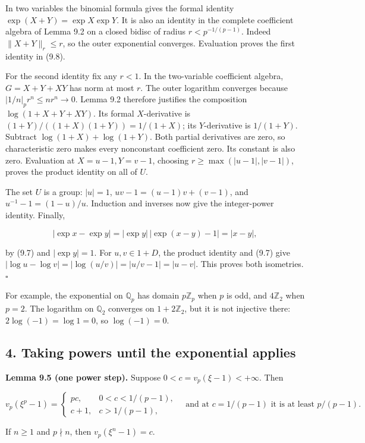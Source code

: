 \documentclass[
  11pt,
  a4paper,
]{article}
\begin{document}
In two variables the binomial formula gives the formal identity
\(\exp(X+Y)=\exp X\exp Y\). It is also an identity in the complete
coefficient algebra of Lemma 9.2 on a closed bidisc of radius
\(r<p^{-1/(p-1)}\). Indeed \(\|X+Y\|_r\le r\), so the outer exponential
converges. Evaluation proves the first identity in (9.8).

For the second identity fix any \(r<1\). In the two-variable coefficient
algebra, \(G=X+Y+XY\) has norm at most \(r\). The outer logarithm
converges because \(|1/n|_p r^n\le nr^n\to0\). Lemma 9.2 therefore
justifies the composition \(\log(1+X+Y+XY)\). Its formal
\(X\)-derivative is \((1+Y)/((1+X)(1+Y))=1/(1+X)\); its \(Y\)-derivative
is \(1/(1+Y)\). Subtract \(\log(1+X)+\log(1+Y)\). Both partial
derivatives are zero, so characteristic zero makes every nonconstant
coefficient zero. Its constant is also zero. Evaluation at
\(X=u-1,Y=v-1\), choosing \(r\ge\max(|u-1|,|v-1|)\), proves the product
identity on all of \(U\).

The set \(U\) is a group: \(|u|=1\), \(uv-1=(u-1)v+(v-1)\), and
\(u^{-1}-1=(1-u)/u\). Induction and inverses now give the integer-power
identity. Finally,

\[
|\exp x-\exp y|=|\exp y|\,|\exp(x-y)-1|=|x-y|,
\]

by (9.7) and \(|\exp y|=1\). For \(u,v\in1+D\), the product identity and
(9.7) give \(|\log u-\log v|=|\log(u/v)|=|u/v-1|=|u-v|\). This proves
both isometries. \(\square\)

For example, the exponential on \(\mathbb Q_p\) has domain
\(p\mathbb Z_p\) when \(p\) is odd, and \(4\mathbb Z_2\) when \(p=2\).
The logarithm on \(\mathbb Q_2\) converges on \(1+2\mathbb Z_2\), but it
is not injective there: \(2\log(-1)=\log1=0\), so \(\log(-1)=0\).

\subsection{4. Taking powers until the exponential
applies}\label{taking-powers-until-the-exponential-applies}

\textbf{Lemma 9.5 (one power step).} Suppose \(0<c=v_p(\xi-1)<+\infty\).
Then

\[
v_p(\xi^p-1)=
\begin{cases}
pc,&0<c<1/(p-1),\\
c+1,&c>1/(p-1),
\end{cases}
\quad\text{and at }c=1/(p-1)\text{ it is at least }p/(p-1).
\tag{9.9}
\]

If \(n\ge1\) and \(p\nmid n\), then \(v_p(\xi^n-1)=c\).
\end{document}
